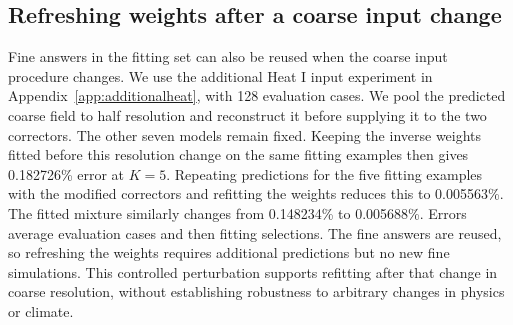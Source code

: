 \subsection{Refreshing weights after a coarse input change}
\label{app:refresh}
Fine answers in the fitting set can also be reused when the coarse input procedure
changes. We use the additional Heat I input experiment in
Appendix~\ref{app:additionalheat}, with 128 evaluation cases. We pool the
predicted coarse field to half resolution and reconstruct it before supplying
it to the two correctors. The other seven models remain fixed. Keeping the
inverse weights fitted before this resolution change on the same fitting examples
then gives 0.182726\% error at $K=5$. Repeating predictions for the five fitting examples
with the modified correctors and refitting the weights reduces this to
0.005563\%. The fitted mixture similarly changes from 0.148234\% to 0.005688\%.
Errors average evaluation cases and then fitting selections. The fine
answers are reused, so refreshing the weights requires additional predictions
but no new fine simulations. This controlled perturbation supports
refitting after that change in coarse resolution, without establishing
robustness to arbitrary changes in physics or climate.
